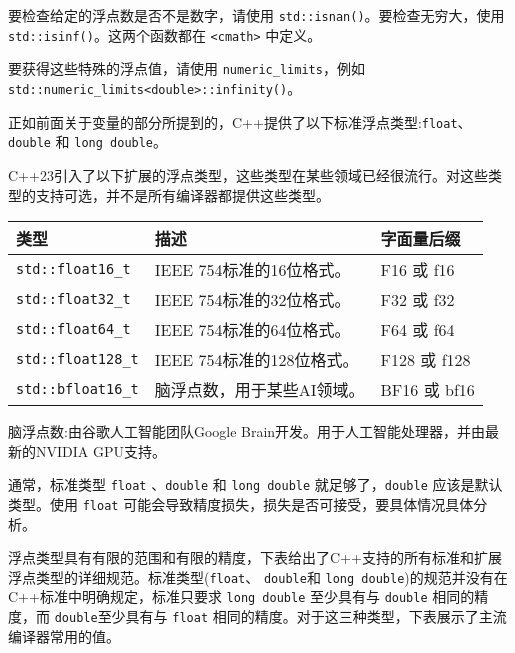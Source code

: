 要检查给定的浮点数是否不是数字，请使用 \verb|std::isnan()|。要检查无穷大，使用 \verb|std::isinf()|。这两个函数都在 \verb|<cmath>| 中定义。

要获得这些特殊的浮点值，请使用 \verb|numeric_limits|，例如 \verb|std::numeric_limits<double>::infinity()|。



正如前面关于变量的部分所提到的，C++提供了以下标准浮点类型:\verb|float|、\verb|double| 和 \verb|long double|。

C++23引入了以下扩展的浮点类型，这些类型在某些领域已经很流行。对这些类型的支持可选，并不是所有编译器都提供这些类型。

\begin{longtable}{|l|l|l|}
\hline
\textbf{类型}    & \textbf{描述}                               & \textbf{字面量后缀} \\ \hline
\endfirsthead
%
\endhead
%
\verb|std::float16_t|  & IEEE 754标准的16位格式。  & F16 或 f16              \\ \hline
\verb|std::float32_t|  & IEEE 754标准的32位格式。  & F32 或 f32              \\ \hline
\verb|std::float64_t|  & IEEE 754标准的64位格式。  & F64 或 f64              \\ \hline
\verb|std::float128_t| & IEEE 754标准的128位格式。 & F128 或 f128            \\ \hline
\verb|std::bfloat16_t| & 脑浮点数，用于某些AI领域。 & BF16 或 bf16            \\ \hline
\end{longtable}

脑浮点数:由谷歌人工智能团队Google Brain开发。用于人工智能处理器，并由最新的NVIDIA GPU支持。

通常，标准类型 \verb|float| 、\verb|double| 和 \verb|long double| 就足够了，\verb|double| 应该是默认类型。使用 \verb|float| 可能会导致精度损失，损失是否可接受，要具体情况具体分析。


浮点类型具有有限的范围和有限的精度，下表给出了C++支持的所有标准和扩展浮点类型的详细规范。标准类型(\verb|float|、 \verb|double|和 \verb|long double|)的规范并没有在C++标准中明确规定，标准只要求 \verb|long double| 至少具有与 \verb|double| 相同的精度，而 \verb|double|至少具有与 \verb|float| 相同的精度。对于这三种类型，下表展示了主流编译器常用的值。

